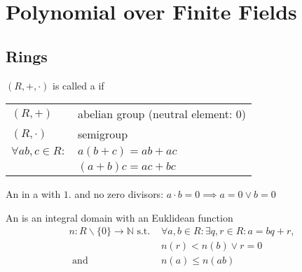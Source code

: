

\section{Polynomial over Finite Fields}

\subsection{Rings}
\begin{definition}
$(R,+,\cdot)$ is called a  if
\begin{tabular}{ll}
  $(R,+)$ & abelian group (neutral element: 0)\\
  $(R,\cdot)$ & semigroup \\
  $\forall ab,c \in R:$ & $a(b+c) = ab+ac$\\
                        & $(a+b)c = ac+bc$\\
\end{tabular}
\end{definition}

\begin{definition}
An  in a  with $1$. 
and no zero divisors: $a\cdot b = 0 \implies a=0 \lor b = 0$
\end{definition}

\begin{definition}
An  is an integral domain with an Euklidean function
\begin{align*}
  n: R \backslash \{0\} \rightarrow \mathbb{N} \text{ s.t. } &\forall a,b \in R: \exists q,r \in R: a = bq + r, \\
  &n(r) < n(b) \lor r=0 \\
  \text{ and } &n(a) \leq n(ab)
\end{align*}
\end{definition}

